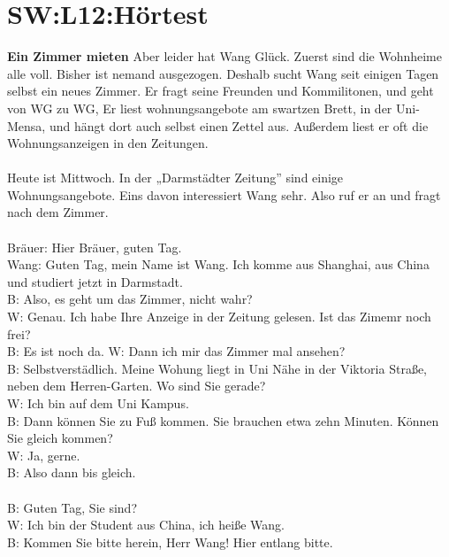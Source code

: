 \section{SW:L12:Hörtest}
\noindent\noindent
\textbf{Ein Zimmer mieten}
Aber leider hat Wang Glück. Zuerst sind die Wohnheime alle voll. Bisher ist nemand ausgezogen.
Deshalb sucht Wang seit einigen Tagen selbst ein neues Zimmer. 
Er fragt seine Freunden und Kommilitonen, und geht von WG zu WG,
Er liest wohnungsangebote am swartzen Brett, in der Uni-Mensa, und
hängt dort auch selbst einen Zettel aus. Außerdem liest er oft die Wohnungsanzeigen in den Zeitungen. \\
\\
\noindent
Heute ist Mittwoch. In der „Darmstädter Zeitung” sind einige Wohnungsangebote.
Eins davon interessiert Wang sehr.  Also ruf er an und fragt nach dem Zimmer. \\
\\
\noindent
Bräuer: Hier Bräuer, guten Tag. \\
Wang: Guten Tag, mein Name ist Wang. Ich komme aus Shanghai, aus China und
studiert jetzt in Darmstadt. \\
B: Also, es geht um das Zimmer, nicht wahr?  \\
W: Genau. Ich habe Ihre Anzeige in der Zeitung gelesen. Ist das Zimemr noch frei? \\
B: Es ist noch da.
W: Dann ich mir das Zimmer mal ansehen?  \\
B: Selbstverstädlich. Meine Wohung liegt in Uni Nähe in der Viktoria Straße,
neben dem Herren-Garten. Wo sind Sie gerade? \\
W: Ich bin auf dem Uni Kampus. \\
B: Dann können Sie zu Fuß kommen.
Sie brauchen etwa zehn Minuten. Können Sie gleich kommen? \\
W: Ja, gerne. \\
B: Also dann bis gleich. \\
\\
\noindent
B: Guten Tag, Sie sind? \\
W: Ich bin der Student aus China, ich heiße Wang. \\
B: Kommen Sie bitte herein, Herr Wang! Hier entlang bitte. 
